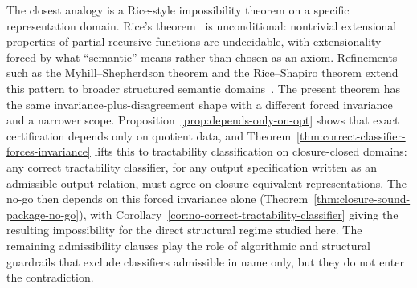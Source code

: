 The closest analogy is a Rice-style impossibility theorem on a specific representation domain. Rice's theorem~\cite{rice1953classes} is unconditional: nontrivial extensional properties of partial recursive functions are undecidable, with extensionality forced by what ``semantic'' means rather than chosen as an axiom. Refinements such as the Myhill--Shepherdson theorem and the Rice--Shapiro theorem extend this pattern to broader structured semantic domains~\cite{myhill1955effective,shapiro1956degrees}. The present theorem has the same invariance-plus-disagreement shape with a different forced invariance and a narrower scope. Proposition~\ref{prop:depends-only-on-opt} shows that exact certification depends only on quotient data, and Theorem~\ref{thm:correct-classifier-forces-invariance} lifts this to tractability classification on closure-closed domains: any correct tractability classifier, for any output specification written as an admissible-output relation, must agree on closure-equivalent representations. The no-go then depends on this forced invariance alone (Theorem~\ref{thm:closure-sound-package-no-go}), with Corollary~\ref{cor:no-correct-tractability-classifier} giving the resulting impossibility for the direct structural regime studied here. The remaining admissibility clauses play the role of algorithmic and structural guardrails that exclude classifiers admissible in name only, but they do not enter the contradiction.
